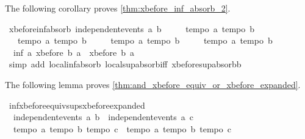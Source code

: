 \begin{isabellebody}
\endisatagproof
{\isafoldproof}%
%
\isadelimproof
%
\endisadelimproof
%
\begin{isamarkuptext}%
The following corollary proves \cref{thm:xbefore_inf_absorb_2}.%
\end{isamarkuptext}\isamarkuptrue%
\isamarkupfalse%
\ xbefore{\isacharunderscore}inf{\isacharunderscore}absorb{\isacharunderscore}{}{\isacharcolon}\ {\isachardoublequoteopen}independent{\isacharunderscore}events\ a\ b\ {\isasymLongrightarrow}\ \isanewline
\ \ {\isasymlbrakk}\ tempo{}\ a{\isacharsemicolon}\ tempo{}\ b\ {\isasymrbrakk}\ {\isasymLongrightarrow}\isanewline
\ \ {\isasymlbrakk}\ tempo{}\ a{\isacharsemicolon}\ tempo{}\ b\ {\isasymrbrakk}\ {\isasymLongrightarrow}\isanewline
\ \ {\isasymlbrakk}\ tempo{}\ a{\isacharsemicolon}\ tempo{}\ b\ {\isasymrbrakk}\ {\isasymLongrightarrow}\isanewline
\ \ {\isasymlbrakk}\ tempo{}\ a{\isacharsemicolon}\ tempo{}\ b\ {\isasymrbrakk}\ {\isasymLongrightarrow}\isanewline
\ \ inf\ a\ {\isacharparenleft}xbefore\ b\ a{\isacharparenright}\ {\isacharequal}\ xbefore\ b\ a{\isachardoublequoteclose}\isanewline
%
\isadelimproof
%
\endisadelimproof
%
\isatagproof
{}\isamarkupfalse%
\ {\isacharparenleft}simp\ add{\isacharcolon}\ local{\isachardot}inf{\isachardot}absorb{}\ local{\isachardot}sup{\isachardot}absorb{\isacharunderscore}iff{}\ xbefore{\isacharunderscore}sup{\isacharunderscore}absorb{\isacharunderscore}{}b{\isacharparenright}%
\endisatagproof
{\isafoldproof}%
%
\isadelimproof
%
\endisadelimproof
%
\begin{isamarkuptext}%
The following lemma proves \cref{thm:and_xbefore_equiv_or_xbefore_expanded}.%
\end{isamarkuptext}\isamarkuptrue%
\isamarkupfalse%
\ inf{\isacharunderscore}xbefore{\isacharunderscore}equiv{\isacharunderscore}sups{\isacharunderscore}xbefore{\isacharunderscore}expanded{\isacharcolon}\ \isanewline
\ \ {\isachardoublequoteopen}independent{\isacharunderscore}events\ a\ b\ {\isasymLongrightarrow}\ independent{\isacharunderscore}events\ a\ c\ {\isasymLongrightarrow}\ \isanewline
\ \ {\isasymlbrakk}tempo{}\ a{\isacharsemicolon}\ tempo{}\ b{\isacharsemicolon}\ tempo{}\ c{\isasymrbrakk}\ {\isasymLongrightarrow}\ {\isasymlbrakk}tempo{}\ a{\isacharsemicolon}\ tempo{}\ b{\isacharsemicolon}\ tempo{}\ c{\isasymrbrakk}\ {\isasymLongrightarrow}\ \isanewline

\end{isabellebody}
